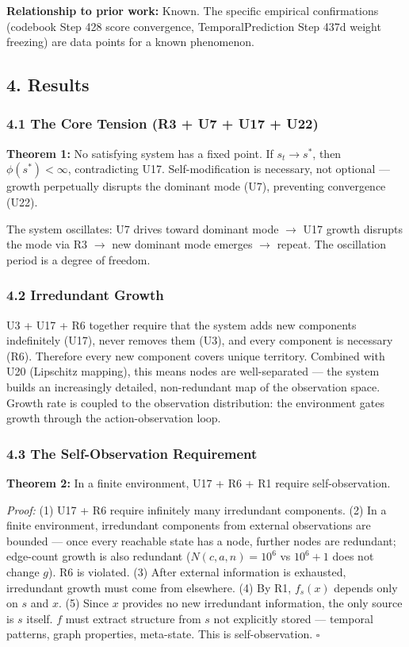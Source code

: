 \documentclass[
  11pt,
]{article}
\begin{document}
\textbf{Relationship to prior work:} Known. The specific empirical
confirmations (codebook Step 428 score convergence, TemporalPrediction
Step 437d weight freezing) are data points for a known phenomenon.

\subsection{4. Results}\label{results}

\subsubsection{4.1 The Core Tension (R3 + U7 + U17 +
U22)}\label{the-core-tension-r3-u7-u17-u22}

\textbf{Theorem 1:} No satisfying system has a fixed point. If
\(s_t \to s^*\), then \(\phi(s^*) < \infty\), contradicting U17.
Self-modification is necessary, not optional --- growth perpetually
disrupts the dominant mode (U7), preventing convergence (U22).

The system oscillates: U7 drives toward dominant mode \(\to\) U17 growth
disrupts the mode via R3 \(\to\) new dominant mode emerges \(\to\)
repeat. The oscillation period is a degree of freedom.

\subsubsection{4.2 Irredundant Growth}\label{irredundant-growth}

U3 + U17 + R6 together require that the system adds new components
indefinitely (U17), never removes them (U3), and every component is
necessary (R6). Therefore every new component covers unique territory.
Combined with U20 (Lipschitz mapping), this means nodes are
well-separated --- the system builds an increasingly detailed,
non-redundant map of the observation space. Growth rate is coupled to
the observation distribution: the environment gates growth through the
action-observation loop.

\subsubsection{4.3 The Self-Observation
Requirement}\label{the-self-observation-requirement}

\textbf{Theorem 2:} In a finite environment, U17 + R6 + R1 require
self-observation.

\emph{Proof:} (1) U17 + R6 require infinitely many irredundant
components. (2) In a finite environment, irredundant components from
external observations are bounded --- once every reachable state has a
node, further nodes are redundant; edge-count growth is also redundant
(\(N(c,a,n) = 10^6\) vs \(10^6+1\) does not change \(g\)). R6 is
violated. (3) After external information is exhausted, irredundant
growth must come from elsewhere. (4) By R1, \(f_s(x)\) depends only on
\(s\) and \(x\). (5) Since \(x\) provides no new irredundant
information, the only source is \(s\) itself. \(f\) must extract
structure from \(s\) not explicitly stored --- temporal patterns, graph
properties, meta-state. This is self-observation. \(\square\)
\end{document}
